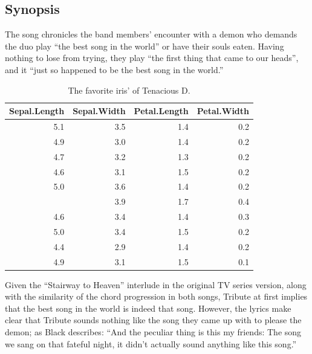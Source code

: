 \documentclass[sigchi]{acmart}
\begin{document}
\hypertarget{synopsis}{%
\subsection{Synopsis}\label{synopsis}}

The song chronicles the band members' encounter with a demon who demands the duo play ``the best song in the world'' or have their souls eaten. Having nothing to lose from trying, they play ``the first thing that came to our heads'', and it ``just so happened to be the best song in the world.''\citep{Wardak2002}

\begin{table}

\caption{\label{tab:table-iris}The favorite iris' of Tenacious D.}
\centering
\begin{tabular}[t]{rrrr}
\toprule
Sepal.Length & Sepal.Width & Petal.Length & Petal.Width\\
\midrule
5.1 & 3.5 & 1.4 & 0.2\\
4.9 & 3.0 & 1.4 & 0.2\\
4.7 & 3.2 & 1.3 & 0.2\\
4.6 & 3.1 & 1.5 & 0.2\\
5.0 & 3.6 & 1.4 & 0.2\\
\addlinespace
5.4 & 3.9 & 1.7 & 0.4\\
4.6 & 3.4 & 1.4 & 0.3\\
5.0 & 3.4 & 1.5 & 0.2\\
4.4 & 2.9 & 1.4 & 0.2\\
4.9 & 3.1 & 1.5 & 0.1\\
\bottomrule
\end{tabular}
\end{table}

Given the ``Stairway to Heaven'' interlude in the original TV series version, along with the similarity of the chord progression in both songs, Tribute at first implies that the best song in the world is indeed that song. However, the lyrics make clear that Tribute sounds nothing like the song they came up with to please the demon; as Black describes: ``And the peculiar thing is this my friends: The song we sang on that fateful night, it didn't actually sound anything like this song.''



\end{document}
